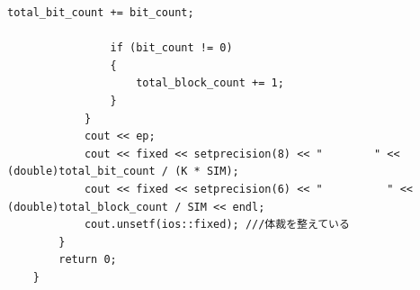 \documentclass[12pt]{jarticle}
\begin{document}
\begin{lstlisting}[style = lstcpp,caption=kadai3\_3.cpp]
                total_bit_count += bit_count;
    
                if (bit_count != 0)
                {
                    total_block_count += 1;
                }
            }
            cout << ep;
            cout << fixed << setprecision(8) << "        " << (double)total_bit_count / (K * SIM);
            cout << fixed << setprecision(6) << "          " << (double)total_block_count / SIM << endl;
            cout.unsetf(ios::fixed); ///体裁を整えている
        }
        return 0;
    }
    
\end{lstlisting}

\end{document}
